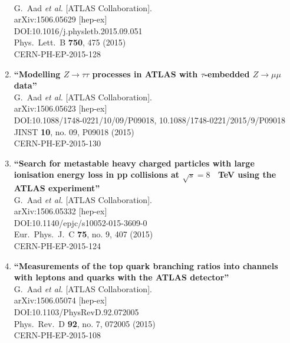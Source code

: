 \documentclass{article}
\begin{document}
\begin{enumerate}
  \\{}G.~Aad {\it et al.} [ATLAS Collaboration].
  \\{}arXiv:1506.05629 [hep-ex]
  \\{}DOI:10.1016/j.physletb.2015.09.051
  \\{}Phys.\ Lett.\ B {\bf 750}, 475 (2015)
  \\{}CERN-PH-EP-2015-128
\item%
{\bf ``Modelling $Z\rightarrow\tau\tau$ processes in ATLAS with $\tau$-embedded $Z\rightarrow\mu\mu$ data''}
  \\{}G.~Aad {\it et al.} [ATLAS Collaboration].
  \\{}arXiv:1506.05623 [hep-ex]
  \\{}DOI:10.1088/1748-0221/10/09/P09018, 10.1088/1748-0221/2015/9/P09018
  \\{}JINST {\bf 10}, no. 09, P09018 (2015)
  \\{}CERN-PH-EP-2015-130
\item%
{\bf ``Search for metastable heavy charged particles with large ionisation energy loss in pp collisions at $\sqrt{s} = 8$  TeV using the ATLAS experiment''}
  \\{}G.~Aad {\it et al.} [ATLAS Collaboration].
  \\{}arXiv:1506.05332 [hep-ex]
  \\{}DOI:10.1140/epjc/s10052-015-3609-0
  \\{}Eur.\ Phys.\ J.\ C {\bf 75}, no. 9, 407 (2015)
  \\{}CERN-PH-EP-2015-124
\item%
{\bf ``Measurements of the top quark branching ratios into channels with leptons and quarks with the ATLAS detector''}
  \\{}G.~Aad {\it et al.} [ATLAS Collaboration].
  \\{}arXiv:1506.05074 [hep-ex]
  \\{}DOI:10.1103/PhysRevD.92.072005
  \\{}Phys.\ Rev.\ D {\bf 92}, no. 7, 072005 (2015)
  \\{}CERN-PH-EP-2015-108

\end{enumerate}
\end{document}
